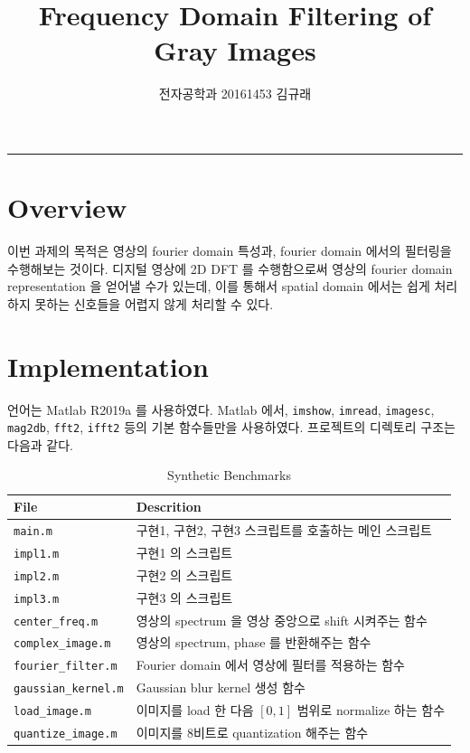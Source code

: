 \documentclass[a4paper, 12p]{paper}
\date{\vspace{-5ex}}
\title{Frequency Domain Filtering of Gray Images}
\author{전자공학과 20161453 김규래}
\def\code#1{\texttt{#1}}
\begin{document}
 
\maketitle\hrule{}\bigskip

\section{Overview}
이번 과제의 목적은 영상의 fourier domain 특성과, fourier domain 에서의 필터링을 수행해보는 것이다. 디지털 영상에 2D DFT 를 수행함으로써 영상의 fourier domain representation 을 얻어낼 수가 있는데, 이를 통해서 spatial domain 에서는 쉽게 처리하지 못하는 신호들을 어렵지 않게 처리할 수 있다.

\section{Implementation}
언어는 Matlab R2019a 를 사용하였다. Matlab 에서, \code{imshow}, \code{imread}, \code{imagesc}, \code{mag2db}, \code{fft2}, \code{ifft2} 등의 기본 함수들만을 사용하였다. 프로젝트의 디렉토리 구조는 다음과 같다.

\begin{table}[htb]
  \centering
\begin{threeparttable}
  \caption{Synthetic Benchmarks}\label{table:synth}
\begin{tabular}{l|l}
  \toprule
  File                      & Descrition \\
  \midrule
  \code{main.m}             & 구현1, 구현2, 구현3 스크립트를 호출하는 메인 스크립트 \\ 
  \code{impl1.m}            & 구현1 의 스크립트 \\
  \code{impl2.m}            & 구현2 의 스크립트 \\
  \code{impl3.m}            & 구현3 의 스크립트 \\
  \code{center\_freq.m}     & 영상의 spectrum 을 영상 중앙으로 shift 시켜주는 함수 \\
  \code{complex\_image.m}   & 영상의 spectrum, phase 를 반환해주는 함수 \\
  \code{fourier\_filter.m}  & Fourier domain 에서 영상에 필터를 적용하는 함수 \\
  \code{gaussian\_kernel.m} & Gaussian blur kernel 생성 함수 \\
  \code{load\_image.m}      & 이미지를 load 한 다음 $[0, 1]$ 범위로 normalize 하는 함수 \\
  \code{quantize\_image.m}  & 이미지를 8비트로 quantization 해주는 함수 \\
  \bottomrule
\end{tabular}
\end{threeparttable}\\
\end{table}
\end{document}
